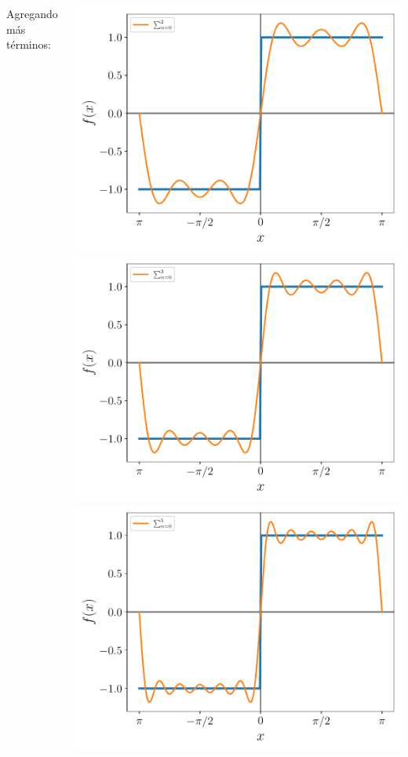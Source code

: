 \documentclass[9pt, aspectratio=169]{beamer}
\begin{document}
\begin{frame}
\begin{columns}[t]
\cx
Agregando más términos:
\begin{center}
  { \includegraphics[scale=0.45]{figs/step-2.pdf} }
  { \includegraphics[scale=0.45]{figs/step-3.pdf} }
  { \includegraphics[scale=0.45]{figs/step-5.pdf} }
\end{center}


\end{columns}
\end{frame}
\end{document}
